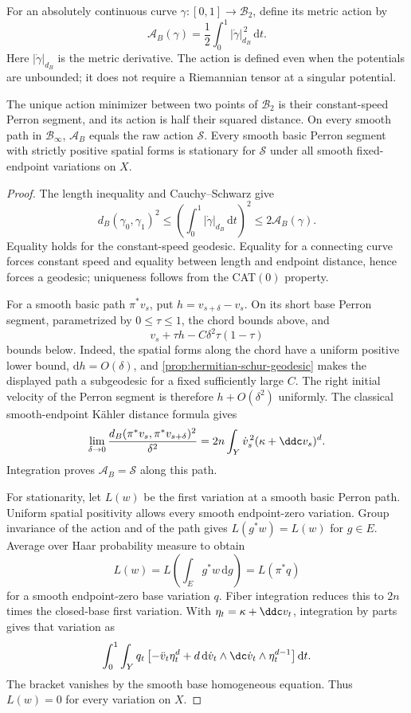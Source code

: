 For an absolutely continuous curve $\gamma:[0,1]\to\mathcal B_2$, define its metric action by
\[
 \mathcal A_B(\gamma)=\frac12\int_0^1|\dot\gamma|_{d_B}^{\,2}\,\mathrm dt.
\]
Here $|\dot\gamma|_{d_B}$ is the metric derivative. The action is defined even when the potentials are unbounded; it does not require a Riemannian tensor at a singular potential.

\begin{proposition}\label{prop:hopf-basic-action}
The unique action minimizer between two points of $\mathcal B_2$ is their constant-speed Perron segment, and its action is half their squared distance. On every smooth path in $\mathcal B_\infty$, $\mathcal A_B$ equals the raw action $\mathscr S$. Every smooth basic Perron segment with strictly positive spatial forms is stationary for $\mathscr S$ under all smooth fixed-endpoint variations on $X$.
\end{proposition}
\begin{proof}
The length inequality and Cauchy--Schwarz give
\[
 d_B(\gamma_0,\gamma_1)^2
 \leq\left(\int_0^1|\dot\gamma|_{d_B}\,\mathrm dt\right)^2
 \leq2\mathcal A_B(\gamma).
\]
Equality holds for the constant-speed geodesic. Equality for a connecting curve forces constant speed and equality between length and endpoint distance, hence forces a geodesic; uniqueness follows from the CAT$(0)$ property.

For a smooth basic path $\pi^*v_s$, put $h=v_{s+\delta}-v_s$. On its short base Perron segment, parametrized by $0\leq\tau\leq1$, the chord bounds above, and
\[
 v_s+\tau h-C\delta^2\tau(1-\tau)
\]
bounds below. Indeed, the spatial forms along the chord have a uniform positive lower bound, $\mathrm dh=O(\delta)$, and \cref{prop:hermitian-schur-geodesic} makes the displayed path a subgeodesic for a fixed sufficiently large $C$. The right initial velocity of the Perron segment is therefore $h+O(\delta^2)$ uniformly. The classical smooth-endpoint K\"ahler distance formula gives
\[
 \lim_{\delta\to0}\frac{d_B(\pi^*v_s,\pi^*v_{s+\delta})^2}{\delta^2}
 =2n\int_Y\dot v_s^{\,2}(\kappa+\ddc v_s)^d.
\]
Integration proves $\mathcal A_B=\mathscr S$ along this path.

For stationarity, let $L(w)$ be the first variation at a smooth basic Perron path. Uniform spatial positivity allows every smooth endpoint-zero variation. Group invariance of the action and of the path gives $L(g^*w)=L(w)$ for $g\in E$. Average over Haar probability measure to obtain
\[
 L(w)=L\left(\int_Eg^*w\,\mathrm dg\right)=L(\pi^*q)
\]
for a smooth endpoint-zero base variation $q$. Fiber integration reduces this to $2n$ times the closed-base first variation. With $\eta_t=\kappa+\ddc v_t$, integration by parts gives that variation as
\[
 \int_0^1\int_Yq_t\left[-\ddot v_t\eta_t^d
 +d\,\mathrm d\dot v_t\wedge\dc\dot v_t\wedge\eta_t^{d-1}\right]\mathrm dt.
\]
The bracket vanishes by the smooth base homogeneous equation. Thus $L(w)=0$ for every variation on $X$.
\end{proof}


